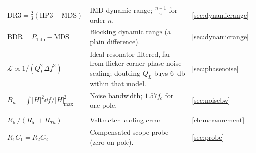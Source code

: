 \begin{longtable}{@{}L{0.31\textwidth}L{0.47\textwidth}L{0.14\textwidth}@{}}
\(\mathrm{DR3}=\tfrac23(\mathrm{IIP3}-\mathrm{MDS})\) & IMD dynamic range; \(\tfrac{n-1}{n}\) for order \(n\). & \cref{sec:dynamicrange} \\
\(\mathrm{BDR}=P_{\SI{1}{\decibel}}-\mathrm{MDS}\) & Blocking dynamic range (a plain difference). & \cref{sec:dynamicrange} \\
\(\mathcal{L}\propto 1/(Q_L^2\Delta f^2)\) & Ideal resonator-filtered, far-from-flicker-corner phase-noise scaling; doubling \(Q_L\) buys \SI{6}{\decibel} within that model. & \cref{sec:phasenoise} \\
\(B_n=\int|H|^2\dd f/|H|^2_{\max}\) & Noise bandwidth; \(1.57f_c\) for one pole. & \cref{sec:noisebw} \\
\addlinespace
{}\\
\(R_{\mathrm{in}}/(R_{\mathrm{in}}+R_{Th})\) & Voltmeter loading error. & \cref{ch:measurement} \\
\(R_1C_1=R_2C_2\) & Compensated scope probe (zero on pole). & \cref{sec:probe} \\
\bottomrule
\end{longtable}
